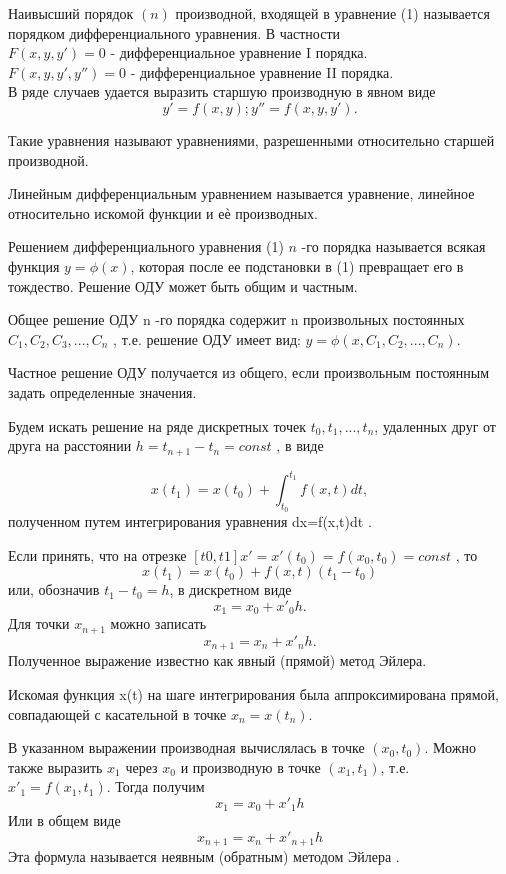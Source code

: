  Наивысший  порядок  $(n)$  производной,  входящей  в  уравнение  (1)  называется 
порядком дифференциального уравнения. В частности\\ 
  $F(x, y, y') = 0$ - дифференциальное уравнение I порядка.\\ 
  $F(x, y, y', y'') = 0$ - дифференциальное уравнение II порядка.\\ 
В ряде случаев удается выразить старшую производную в явном виде\\   
$$ y'=f(x,y );   y''=f(x , y ,y ').$$ 

Такие  уравнения  называют  уравнениями,  разрешенными  относительно  старшей 
производной. 

Линейным  дифференциальным уравнением  называется  уравнение,  линейное  относительно 
искомой функции и еѐ производных.  

  Решением дифференциального уравнения (1) $ n$ -го порядка называется всякая функция 
$y=\phi(x)$, которая после ее подстановки в (1) превращает его в тождество. Решение ОДУ 
может быть общим и частным. 

Общее решение ОДУ n -го порядка содержит  n  произвольных постоянных \\
$C_1 , C_2 ,C_3,..., C_n $ , т.е. решение ОДУ имеет вид:  $y =\phi(x,C_1,C_2,...,C_n)$. 
         
Частное решение ОДУ получается из общего, если  произвольным постоянным задать 
определенные значения. 
  
Будем искать решение на ряде дискретных точек  $t_0,t _1,...,t_n$, удаленных друг от друга на 
расстоянии $h = t_{n+1}- t_n=const$ , в виде 
                                     
$$x(t_1)=x(t_0)+\int_{t_0}^{t_1}f(x,t)dt,$$
полученном путем интегрирования уравнения  dx=f(x,t)dt . 

Если принять, что на отрезке $[t0,t1] x' = x'(t_0) = f (x_0,t_0) = const$ , то 
$$ x(t_1)=x(t_0)+f(x,t)(t_1-t_0)$$
или, обозначив $t_1-t_0=h$, в дискретном виде  
$$x_1=x_0+x'_0h.$$
Для точки  $x_{n+1}$ можно записать  
                                             $$  x_{n+1}= x_n +x'_nh.  $$ 
Полученное выражение известно как явный (прямой) метод Эйлера. 

Искомая  функция  x(t)  на  шаге  интегрирования  была  аппроксимирована  прямой, 
совпадающей с касательной в точке  $x_n=x (t_n)$.  
 
В указанном выражении производная вычислялась в точке  $(x_0,t_0)$. Можно также выразить  $x_1$ 
через  $x_0$  и производную в точке $(x_1,t_1)$, т.е.  $x'_1 = f (x_1,t_1)$. Тогда  получим 
$$x_1=x_0+x'_1h$$
Или в общем виде 
                                          $$x_{n+1} =x_n+x'_{n+1} h $$ 
Эта формула называется неявным (обратным) методом Эйлера .
 
